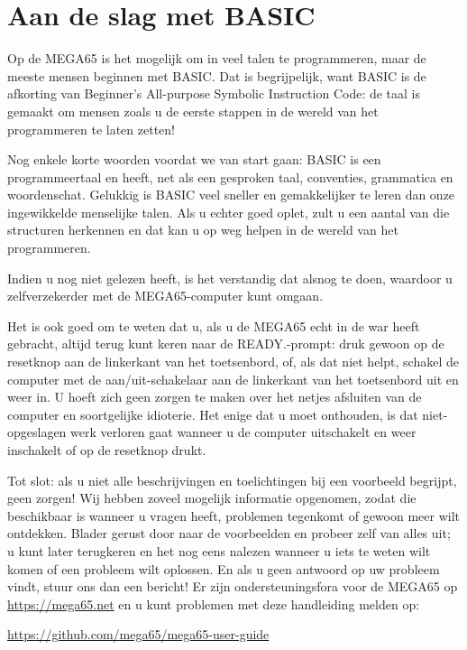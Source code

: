 \chapter{Aan de slag met BASIC}
\label{cha:basic-getting-started}

Op de MEGA65 is het mogelijk om in veel talen te programmeren, maar de meeste mensen beginnen met BASIC. Dat is begrijpelijk, want BASIC is de afkorting van Beginner's All-purpose Symbolic Instruction Code: de taal is gemaakt om mensen zoals u de eerste stappen in de wereld van het programmeren te laten zetten!

Nog enkele korte woorden voordat we van start gaan: BASIC is een programmeertaal en heeft, net als een gesproken taal, conventies, grammatica en woordenschat. Gelukkig is BASIC veel sneller en gemakkelijker te leren dan onze ingewikkelde menselijke talen. Als u echter goed oplet, zult u een aantal van die structuren herkennen en dat kan u op weg helpen in de wereld van het programmeren.

Indien u  nog niet gelezen heeft, is het verstandig dat alsnog te doen, waardoor u zelfverzekerder met de MEGA65-computer kunt omgaan.

Het is ook goed om te weten dat u, als u de MEGA65 echt in de war heeft gebracht, altijd terug kunt keren naar de READY.-prompt: druk gewoon op de resetknop aan de linkerkant van het toetsenbord, of, als dat niet helpt, schakel de computer met de aan/uit-schakelaar aan de linkerkant van het toetsenbord uit en weer in. U hoeft zich geen zorgen te maken over het netjes afsluiten van de computer en soortgelijke idioterie. Het enige dat u moet onthouden, is dat niet-opgeslagen werk verloren gaat wanneer u de computer uitschakelt en weer inschakelt of op de resetknop drukt.

Tot slot: als u niet alle beschrijvingen en toelichtingen bij een voorbeeld begrijpt, geen zorgen! Wij hebben zoveel mogelijk informatie opgenomen, zodat die beschikbaar is wanneer u vragen heeft, problemen tegenkomt of gewoon meer wilt ontdekken. Blader gerust door naar de voorbeelden en probeer zelf van alles uit; u kunt later terugkeren en het nog eens nalezen wanneer u iets te weten wilt komen of een probleem wilt oplossen. En als u geen antwoord op uw probleem vindt, stuur ons dan een bericht! Er zijn ondersteuningsfora voor de MEGA65 op \url{https://mega65.net} en u kunt problemen met deze handleiding melden op:

\url{https://github.com/mega65/mega65-user-guide}

